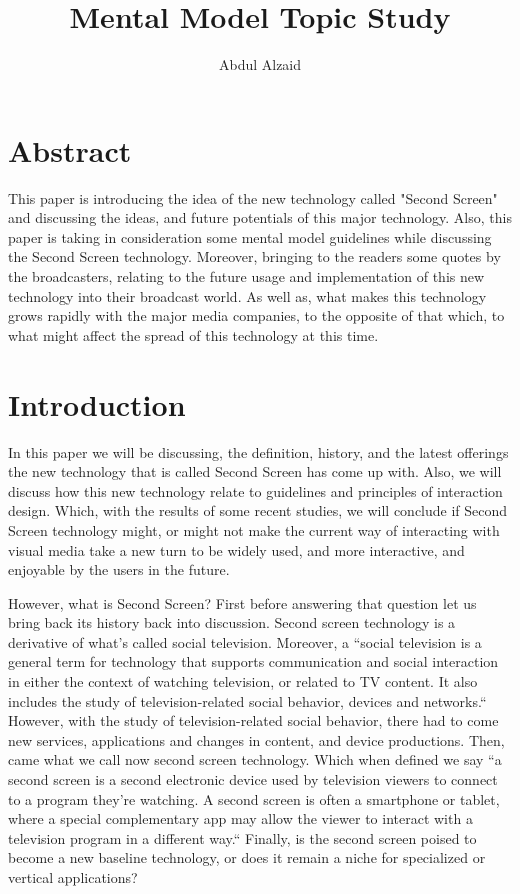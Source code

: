 \documentclass[12pt, oneside]{amsart}   	%
\title{Mental Model Topic Study}
\author{Abdul Alzaid}
\begin{document}
 \maketitle
 \section{Abstract} %
This paper is introducing the idea of the new technology called "Second Screen" and discussing the ideas, and future potentials of this major technology.  Also, this paper is taking in consideration some mental model guidelines while discussing the Second Screen technology.  Moreover, bringing to the readers some quotes by the broadcasters, relating to the future usage and implementation of this new technology into their broadcast world.  As well as, what makes this technology grows rapidly with the major media companies, to the opposite of that which, to what might affect the spread of this technology at this time.

 \section{Introduction}
In this paper we will be discussing, the definition, history, and the latest offerings the new technology that is called Second Screen has come up with. Also, we will discuss how this new technology relate to guidelines and principles of interaction design. Which, with the results of some recent studies, we will conclude if Second Screen technology might, or might not make the current way of interacting with visual media take a new turn to be widely used, and more interactive, and enjoyable by the users in the future. 

However, what is Second Screen?  First before answering that question let us bring back its history back into discussion.  Second screen technology is a derivative of  what's called social television. Moreover, a ``social television is a general term for technology that supports communication and social interaction in either the context of watching television, or related to TV content. It also includes the study of television-related social behavior, devices and networks.``\cite{defOfSocialTV}   However, with the study of television-related social behavior, there had to come new services, applications and changes in content, and device productions. Then, came what we call now second screen technology.  Which when defined we say ``a second screen is a second electronic device used by television viewers to connect to a program they're watching. A second screen is often a smartphone or tablet, where a special complementary app may allow the viewer to interact with a television program in a different way.``\cite{Second-Screen-Def}  Finally, is the second screen poised to become a 
new baseline technology, or does it remain a niche for specialized or vertical applications? 
\end{document}
